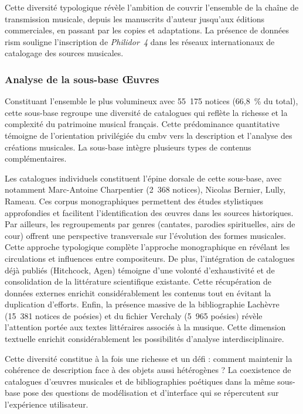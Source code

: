 Cette diversité typologique révèle l'ambition de couvrir l'ensemble de la chaîne de transmission musicale, depuis les manuscrits d'auteur jusqu'aux éditions commerciales, en passant par les copies et adaptations. La présence de données \gls{rism} souligne l'inscription de \textit{Philidor~4} dans les réseaux internationaux de catalogage des sources musicales.

\subsubsection{Analyse de la sous-base Œuvres}

Constituant l'ensemble le plus volumineux avec 55~175 notices (66,8~\% du total), cette sous-base regroupe une diversité de catalogues qui reflète la richesse et la complexité du patrimoine musical français. Cette prédominance quantitative témoigne de l'orientation privilégiée du \gls{cmbv} vers la description et l'analyse des créations musicales. La sous-base intègre plusieurs types de contenus complémentaires.

Les catalogues individuels constituent l'épine dorsale de cette sous-base, avec notamment Marc-Antoine Charpentier (2~368 notices), Nicolas Bernier, Lully, Rameau. Ces corpus monographiques permettent des études stylistiques approfondies et facilitent l'identification des œuvres dans les sources historiques. Par ailleurs, les regroupements par genres (cantates, parodies spirituelles, airs de cour) offrent une perspective transversale sur l'évolution des formes musicales. Cette approche typologique complète l'approche monographique en révélant les circulations et influences entre compositeurs. De plus, l'intégration de catalogues déjà publiés (Hitchcock, Agen) témoigne d'une volonté d'exhaustivité et de consolidation de la littérature scientifique existante. Cette récupération de données externes enrichit considérablement les contenus tout en évitant la duplication d'efforts. Enfin, la présence massive de la bibliographie Lachèvre (15~381 notices de poésies) et du fichier Verchaly (5~965 poésies) révèle l'attention portée aux textes littéraires associés à la musique. Cette dimension textuelle enrichit considérablement les possibilités d'analyse interdisciplinaire.

Cette diversité constitue à la fois une richesse et un défi : comment maintenir la cohérence de description face à des objets aussi hétérogènes ? La coexistence de catalogues d'œuvres musicales et de bibliographies poétiques dans la même sous-base pose des questions de modélisation et d'interface qui se répercutent sur l'expérience utilisateur.

